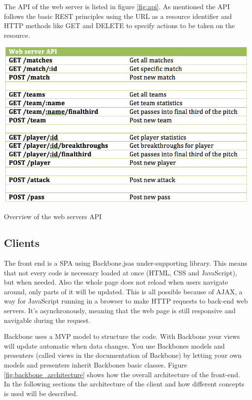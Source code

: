 The \ac{API} of the web server is listed in figure \ref{fig:api}. As mentioned the \ac{API} follows the basic \ac{REST} principles using the URL as a resource identifier and HTTP methods like GET and DELETE to specify actions to be taken on the resource.

\begin{table}[ht!]
\centering
\includegraphics[width=1\textwidth]{images/implementation/API.png}
\caption{Overview of the web servers API}
\label{fig:api}
\end{table}

\subsection{Clients}

The front end is a \ac{SPA} using Backbone.js\footnotemark as under-supporting library. This means that not every code is necessary loaded at once (\ac{HTML}, \ac{CSS} and JavaScript), but when needed. Also the whole page does not reload when users navigate around, only parts of it will be updated. This is all possible because of \ac{AJAX}, a way for JavaScript running in a browser to make HTTP requests to back-end web servers. It’s asynchronously, meaning that the web page is still responsive and navigable during the request\cite{ajax}.

Backbone uses a \ac{MVP} model to structure the code. With Backbone your views will update automatic when data changes. You use Backbones models and presenters (called views in the documentation of Backbone) by letting your own models and presenters inherit Backbones basic classes. Figure \ref{fig:backbone_architecture} shows how the overall architecture of the front-end. In the following sections the architecture of the client and how different concepts is used will be described. 

